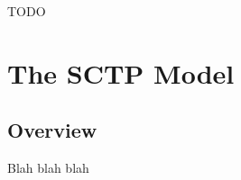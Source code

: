 \ifdraft TODO

\chapter{The SCTP Model}
\label{cha:sctp}

\section{Overview}

Blah blah blah

\fi



